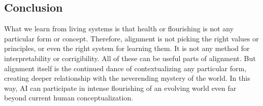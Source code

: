 \documentclass[12pt]{article}
\begin{document}
\subsection{Conclusion}




What we learn from living systems is that health or flourishing is not any particular form or concept. Therefore, alignment is not picking the right values or principles, or even the right system for learning them. It is not any method for interpretability or corrigibility. All of these can be useful parts of alignment. But alignment itself is the continued dance of contextualizing any particular form, creating deeper relationship with the neverending mystery of the world. In this way, AI can participate in intense flourishing of an evolving world even far beyond current human conceptualization.





\end{document}
